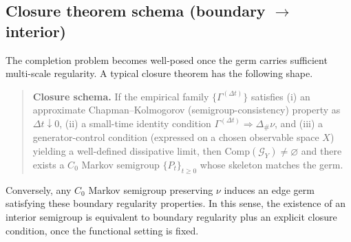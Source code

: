 \documentclass[11pt]{article}
\begin{document}
\subsection{Closure theorem schema (boundary \texorpdfstring{$\to$}{->} interior)}
The completion problem becomes well-posed once the germ carries sufficient multi-scale regularity. A
typical closure theorem has the following shape.

\begin{quote}
\textbf{Closure schema.} If the empirical family $\{\Gamma^{(\Delta t)}\}$ satisfies (i) an approximate
Chapman--Kolmogorov (semigroup-consistency) property as $\Delta t\downarrow 0$, (ii) a small-time
identity condition $\Gamma^{(\Delta t)}\Rightarrow \Delta_\#\nu$, and (iii) a generator-control
condition (expressed on a chosen observable space $X$) yielding a well-defined dissipative limit, then
$\mathrm{Comp}(\mathcal G_Y)\neq\varnothing$ and there exists a $C_0$ Markov semigroup
$\{P_t\}_{t\ge 0}$ whose skeleton matches the germ.
\end{quote}

Conversely, any $C_0$ Markov semigroup preserving $\nu$ induces an edge germ satisfying these boundary
regularity properties. In this sense, the existence of an interior semigroup is equivalent to boundary
regularity plus an explicit closure condition, once the functional setting is fixed.
\end{document}
